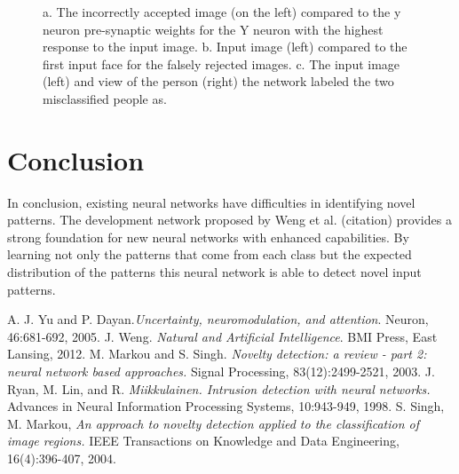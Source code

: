 \documentclass[conference]{IEEEtran}
\begin{document}
\begin{figure}
\begin{tabular}{cc}
\end{tabular}
\caption{a. The incorrectly accepted image (on the left) compared to the y neuron pre-synaptic weights for the Y neuron with the highest response to the input image. b. Input image (left) compared to the first input face for the falsely rejected images. c. The input image (left) and view of the person (right) the network labeled the two misclassified people as.}
\label{fig:6_epoch_errors}
\end{figure}

\section{Conclusion}
In conclusion, existing neural networks have difficulties in identifying novel patterns.  The development network proposed by Weng et al. (citation) provides a strong foundation for new neural networks with enhanced capabilities.  By learning not only the patterns that come from each class but the expected distribution of the patterns this neural network is able to detect novel input patterns.
\newpage
\begin{thebibliography}{1}
 A. J. Yu and P. Dayan.{\it  Uncertainty, neuromodulation, and attention}. Neuron, 46:681-692, 2005.
 J. Weng. {\it Natural and Artificial Intelligence}. BMI Press, East Lansing, 2012.
 M. Markou and S. Singh. {\it Novelty detection: a review - part 2: neural network based approaches.} Signal Processing, 83(12):2499-2521, 2003.
 J. Ryan, M. Lin, and R. {\it Miikkulainen. Intrusion detection with neural networks.} Advances in Neural Information Processing Systems, 10:943-949, 1998.
 S. Singh, M. Markou, {\it An approach to novelty detection applied to the classification of image regions.} IEEE Transactions on Knowledge and Data Engineering, 16(4):396-407, 2004.
\end{thebibliography}
\end{document}
